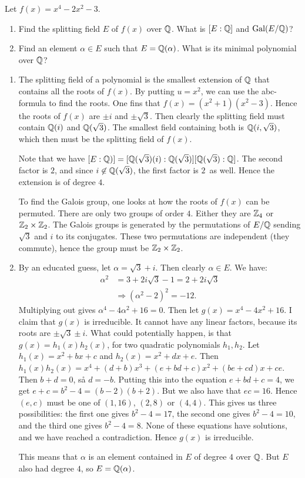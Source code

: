 \documentclass[11pt, english]{article}
\begin{document}
\begin{exc}[Eksamen 2008, 3]
Let $f(x)= x^4-2x^2-3$. 
\begin{enumerate}
	\item Find the splitting field $E$ of $f(x)$ over $\mathbb{Q}$. What is $[E:\mathbb{Q}]$ and $\text{Gal}(E/\mathbb{Q})$?
	\item Find an element $\alpha \in E$ such that $E=\mathbb{Q}(\alpha)$. What is its minimal polynomial over $\mathbb{Q}$?
\end{enumerate}
\end{exc}
\begin{sol}
\begin{enumerate}
	\item The splitting field of a polynomial is the smallest extension of $\mathbb{Q}$ that contains all the roots of $f(x)$. By putting $u=x^2$, we can use the abc-formula to find the roots. One fins that $f(x)=(x^2+1)(x^2-3)$. Hence the roots of $f(x)$ are $\pm i$ and $\pm \sqrt{3}$. Then clearly the splitting field must contain $\mathbb{Q}(i)$ and $\mathbb{Q}(\sqrt 3)$. The smallest field containing both is $\mathbb{Q}(i, \sqrt 3)$, which then must be the splitting field of $f(x)$. 

	Note that we have $[E:\mathbb{Q})]=[\mathbb{Q}(\sqrt 3)(i):\mathbb{Q}(\sqrt 3)][\mathbb{Q}(\sqrt 3):\mathbb{Q}]$. The second factor is $2$, and since $i \not \in \mathbb{Q}(\sqrt 3)$, the first factor is $2$ as well. Hence the extension is of degree $4$.

	To find the Galois group, one looks at how the roots of $f(x)$ can be permuted. There are only two groups of order $4$. Either they are $\mathbb{Z}_4$ or $\mathbb{Z}_2 \times \mathbb{Z}_2$. The Galois groups is generated by the permutations of $E/\mathbb{Q}$ sending $\sqrt 3$ and $i$ to its conjugates. These two permutations are independent (they commute), hence the group must be $\mathbb{Z}_2 \times \mathbb{Z}_2$.
	\item By an educated guess, let $\alpha=\sqrt 3 + i$. Then clearly $\alpha \in E$. We have:
	\begin{align*}
	\alpha^2 &= 3 + 2 i \sqrt 3  -1 = 2 + 2i  \sqrt 3 \\
	&\Rightarrow  (\alpha^2-2)^2 = -12.
	\end{align*}
	Multiplying out gives $\alpha^4-4\alpha^2+16=0$. Then let $g(x)=x^4-4x^2+16$. I claim that $g(x)$ is irreducible. It cannot have any linear factors, because its roots are $\pm \sqrt 3 \pm i$. What could potentially happen, is that $g(x)=h_1(x)h_2(x)$, for two quadratic polynomials $h_1,h_2$. Let $h_1(x)=x^2+bx+c$ and $h_2(x)=x^2+dx+e$. Then $h_1(x)h_2(x) = x^4+(d+b)x^3+(e+bd+c)x^2+(be+cd)x+ce$. Then $b+d=0$, så $d=-b$. Putting this into the equation $e+bd+c=4$, we get $e+c=b^2-4=(b-2)(b+2)$. But we also have that $ec=16$. Hence $(e,c)$ must be one of $(1,16)$, $(2,8)$ or $(4,4)$. This gives us three possibilities: the first one gives $b^2-4=17$, the second one gives $b^2-4=10$, and the third one gives $b^2-4=8$. None of these equations have solutions, and we have reached a contradiction. Hence $g(x)$ is irreducible.

	This means that $\alpha$ is an element contained in $E$ of degree $4$ over $\mathbb{Q}$. But $E$ also had degree $4$, so $E= \mathbb{Q}(\alpha)$.
\end{enumerate}
\end{sol}
\end{document}

